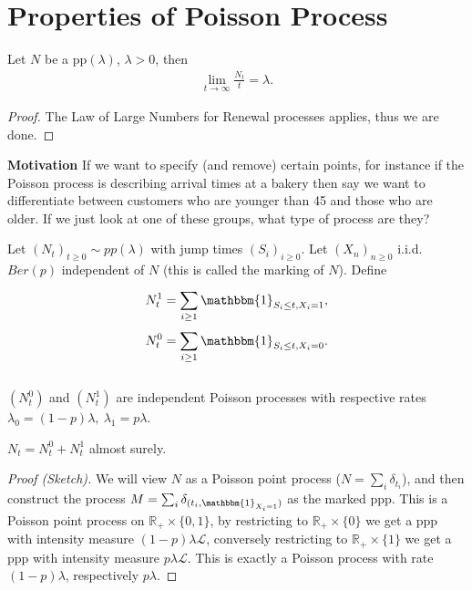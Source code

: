 \section{Properties of Poisson Process}

\begin{theorem}
Let $N$ be a $ \textrm{pp}(\lambda)$, $\lambda > 0$, then 
\begin{align}
	\boxed{	\lim_{t \to \infty} \frac{N_t}{t}=\lambda.}
\end{align}
\end{theorem}
\begin{proof}
	{\color{blue}The Law of Large Numbers for Renewal processes applies, thus we are done.}
\end{proof}
\noindent
\textbf{Motivation} If we want to specify (and remove) certain points, for instance if the Poisson process is describing arrival times at a bakery then say we want to differentiate between customers who are younger than 45 and those who are older. If we just look at one of these groups, what type of process are they?

\begin{theorem}[Thinning]
	Let $(N_t)_{t\geq 0} \sim pp(\lambda)$ with jump times $(S_i)_{i\geq 0}$. Let $(X_n)_{n\geq 0}$ i.i.d. $Ber(p)$ independent of $N$ (this is called the marking of $N$). Define 
	\begin{align}
		N_t^1 &= \sum_{i\geq 1}^{} \mathbbm{1} _{S_i \leq t, X_i = 1},\\
		N_t^0 &= \sum_{i \geq 1}^{} \mathbbm{1}_{S_i \leq t, X_i = 0}.
	\end{align}
\\ \noindent	
	$(N_t^0)$ and  $(N_t^1)$ are independent Poisson processes with respective rates $\lambda_0 = (1-p)\lambda,\ \lambda _1=p\lambda $.
\end{theorem}
\begin{rmk}[]
	$N_t = N_{t}^{0}+N_{t}^{1}$ almost surely.
\end{rmk}
{\color{blue}
\begin{proof}[Proof (Sketch)]
	We will view $N$ as a Poisson point process ($N=\sum_{i}^{} \delta_{t_i}$), and then construct the process $M=\sum_{i}^{} \delta_{(t_i, \mathbbm{1}_{X_i= 1}) }$ as the marked ppp. This is a Poisson point process on $\mathbb{R}_+ \times \{0,1\}$, by restricting to $\mathbb{R}_+ \times \{0\}$ we get a ppp with intensity measure $ (1-p)\lambda \mathcal{L}$, conversely restricting to $\mathbb{R}_+ \times \{1\}$ we get a ppp with intensity measure $p \lambda \mathcal{L}$. This is exactly a Poisson process with rate $(1-p) \lambda $, respectively $p \lambda $.  	
\end{proof}}

